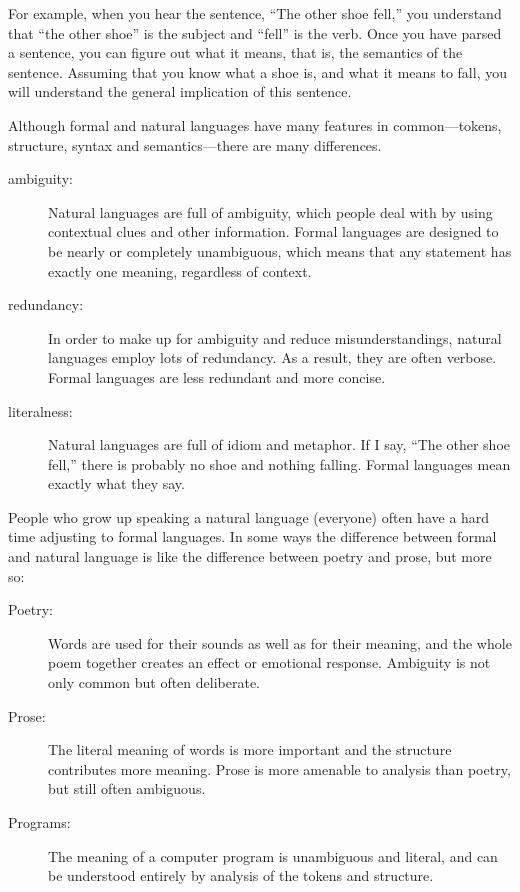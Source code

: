 For example, when you hear the sentence, ``The other shoe fell,'' you
understand that ``the other shoe'' is the subject and ``fell'' is the
verb.  Once you have parsed a sentence, you can figure out what it
means, that is, the semantics of the sentence.  Assuming that you know
what a shoe is, and what it means to fall, you will understand the
general implication of this sentence.

Although formal and natural languages have many features in
common---tokens, structure, syntax and semantics---there are many
differences.


\begin{description}

\item[ambiguity:] Natural languages are full of ambiguity, which
people deal with by using contextual clues and other information.
Formal languages are designed to be nearly or completely unambiguous,
which means that any statement has exactly one meaning,
regardless of context.

\item[redundancy:] In order to make up for ambiguity and reduce
misunderstandings, natural languages employ lots of
redundancy.  As a result, they are often verbose.  Formal languages
are less redundant and more concise.

\item[literalness:] Natural languages are full of idiom and
metaphor.  If I say, ``The other shoe fell,'' there is probably
no shoe and nothing falling.  Formal languages mean
exactly what they say.

\end{description}

People who grow up speaking a natural language (everyone) often have a
hard time adjusting to formal languages.  In some ways the difference
between formal and natural language is like the difference between
poetry and prose, but more so:


\begin{description}

\item[Poetry:] Words are used for their sounds as well as for
their meaning, and the whole poem together creates an effect or
emotional response.  Ambiguity is not only common but often
deliberate.

\item[Prose:] The literal meaning of words is more important
and the structure contributes more meaning.  Prose is more amenable to
analysis than poetry, but still often ambiguous.

\item[Programs:] The meaning of a computer program is unambiguous
and literal, and can be understood entirely by analysis of the
tokens and structure.

\end{description}

